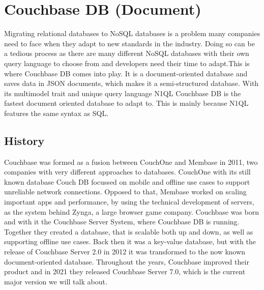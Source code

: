 
\chapter{Couchbase DB (Document)} \label{ch:couchbase}

Migrating relational databases to \ac{NoSQL} databases is a problem many companies need to face when they adapt to new standards in the industry. Doing so can be a tedious process as there are many different \ac{NoSQL} databases with their own query language to choose from and developers need their time to adapt.\newline This is where Couchbase DB comes into play. It is a document-oriented database and saves data in \ac{JSON} documents, which makes it a semi-structured database. With its multimodel trait and unique query language \ac{N1QL} Couchbase DB is the fastest document oriented database to adapt to. This is mainly because \ac{N1QL} features the same syntax as \ac{SQL}. \parencite{BigdataInsiderOnCouchbase}

\section{History}
Couchbase was formed as a fusion between CouchOne and Membase in 2011, two companies with very different approaches to databases. CouchOne with its still known database Couch DB focussed on mobile and offline use cases to support unreliable network connections. Opposed to that, Membase worked on scaling important apps and performance, by using the technical development of servers, as the system behind Zynga, a large browser game company. Couchbase was born and with it the Couchbase Server System, where Couchbase DB is running. Together they created a database, that is scalable both up and down, as well as supporting offline use cases.  \parencite{CouchOne-Membase-Fusion}\newline
Back then it was a key-value database, but with the release of Couchbase Server 2.0 in 2012 it was transformed to the now known document-oriented database. Throughout the years, Couchbase improved their product and in 2021 they released Couchbase Server 7.0, which is the current major version we will talk about. \parencite{CouchbaseAbout}


